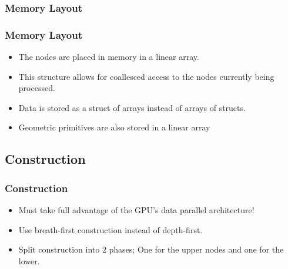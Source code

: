 \documentclass{beamer}
\begin{document}
\subsubsection{Memory Layout}
\begin{frame}
  \frametitle{Memory Layout}

  \begin{itemize}
  \item The nodes are placed in memory in a linear array.
    
  \item This structure allows for coallesced access to the nodes currently being
    processed.
  \item Data is stored as a struct of arrays instead of arrays of structs.
  \item Geometric primitives are also stored in a linear array
  \end{itemize}
\end{frame}

\subsection{Construction}
\begin{frame}
  \frametitle{Construction}
  
  \begin{itemize}
    \item Must take full advantage of the GPU's data parallel architecture!
    \item Use breath-first construction instead of depth-first.
    \item Split construction into 2 phases; One for the upper nodes and one for
      the lower.
  \end{itemize}
\end{frame}
\end{document}

